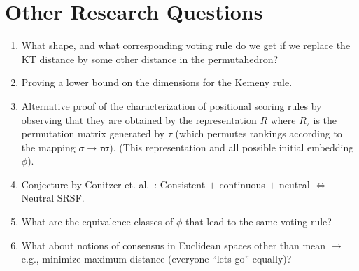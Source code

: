 \documentclass[10pt,letterpaper]{article}
\begin{document}

\section{Other Research Questions}
\begin{enumerate}
\item What shape, and what corresponding voting rule do we get if we replace the KT distance by some other distance in the permutahedron?
\item Proving a lower bound on the dimensions for the Kemeny rule.
\item Alternative proof of the characterization of positional scoring rules by observing that they are obtained by the representation $R$ where $R_{\tau}$ is the permutation matrix generated by $\tau$ (which permutes rankings according to the mapping $\sigma \rightarrow \tau \sigma$). (This representation and all possible initial embedding $\phi$). 
\item Conjecture by Conitzer et. al.~\cite{CRX09}: Consistent $+$ continuous $+$ neutral $\Leftrightarrow$ Neutral SRSF.
\item What are the equivalence classes of $\phi$ that lead to the same voting rule?
\item What about notions of consensus in Euclidean spaces other than mean $\rightarrow$ e.g., minimize maximum distance (everyone ``lets go'' equally)?
\end{enumerate}
\end{document}
